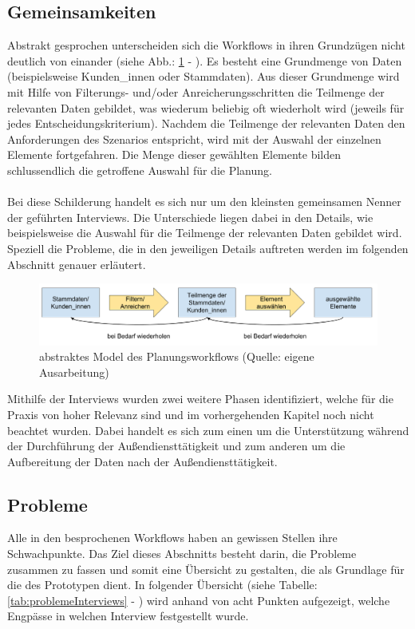 \documentclass[Bachelorarbeit.tex]{subfiles}
\begin{document}
\subsection*{Gemeinsamkeiten}
\label{subsubsec:Ergebnisse der Interviews:gemeinsamkeiten}
Abstrakt gesprochen unterscheiden sich die Workflows in ihren Grundzügen nicht deutlich von einander (siehe Abb.: \ref{fig:abstrakterWorkflowPlannung} - ). 
Es besteht eine Grundmenge von Daten (beispielsweise Kunden\_innen oder Stammdaten). 
Aus dieser Grundmenge wird mit Hilfe von Filterungs- und/oder Anreicherungsschritten die Teilmenge der relevanten Daten gebildet, was wiederum beliebig oft wiederholt wird (jeweils für jedes Entscheidungskriterium).
Nachdem die Teilmenge der relevanten Daten den Anforderungen des Szenarios entspricht, wird mit der Auswahl der einzelnen Elemente fortgefahren.
Die Menge dieser gewählten Elemente bilden schlussendlich die getroffene Auswahl für die Planung.\\
\\
Bei diese Schilderung handelt es sich nur um den kleinsten gemeinsamen Nenner der geführten Interviews.
Die Unterschiede liegen dabei in den Details, wie beispielsweise die Auswahl für die Teilmenge der relevanten Daten gebildet wird.
Speziell die Probleme, die in den jeweiligen Details auftreten werden im folgenden Abschnitt genauer erläutert.

\begin{figure}[h]
	\includegraphics[width=\linewidth]{img/analyse/abstrakterWorkflowPlannung}
	\caption[abstrakter Planungsworkflow]{abstraktes Model des Planungsworkflows (Quelle: eigene Ausarbeitung)}
	\label{fig:abstrakterWorkflowPlannung}
\end{figure}

Mithilfe der Interviews wurden zwei weitere Phasen identifiziert, welche für die Praxis von hoher Relevanz sind und im vorhergehenden Kapitel noch nicht beachtet wurden.
Dabei handelt es sich zum einen um die Unterstützung während der Durchführung der Außendiensttätigkeit und zum anderen um die Aufbereitung der Daten nach der Außendiensttätigkeit.

\subsection*{Probleme}
\label{subsubsec:Ergebnisse der Interviews:probleme}
Alle in den  besprochenen Workflows haben an gewissen Stellen ihre Schwachpunkte. 
Das Ziel dieses Abschnitts besteht darin, die Probleme zusammen zu fassen und somit eine Übersicht zu gestalten, die als Grundlage für die  des Prototypen dient. 
In folgender Übersicht (siehe Tabelle: \ref{tab:problemeInterviews} - ) wird anhand von acht Punkten aufgezeigt, welche Engpässe in welchen Interview festgestellt wurde.
\end{document}
